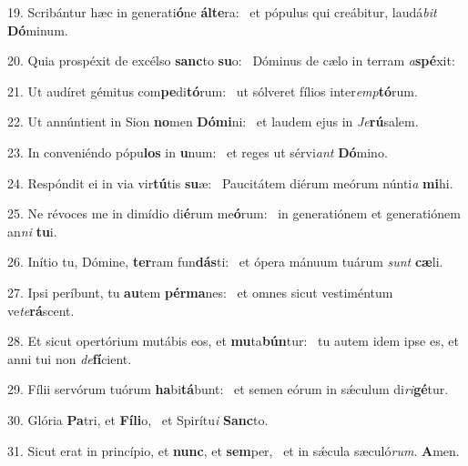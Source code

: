 19. Scribántur hæc in generati\textbf{ó}ne \textbf{ál}\textbf{te}ra: \ast\  et pópulus qui creábitur, laudá\textit{bit} \textbf{Dó}minum.\

20. Quia prospéxit de excélso \textbf{sanc}to \textbf{su}o: \ast\  Dóminus de cælo in terram \textit{a}\textbf{spé}xit:\

21. Ut audíret gémitus com\textbf{pe}di\textbf{tó}rum: \ast\  ut sólveret fílios inter\textit{emp}\textbf{tó}rum.\

22. Ut annúntient in Sion \textbf{no}men \textbf{Dó}\textbf{mi}ni: \ast\  et laudem ejus in \textit{Je}\textbf{rú}salem.\

23. In conveniéndo pópu\textbf{los} in \textbf{u}num: \ast\  et reges ut sérvi\textit{ant} \textbf{Dó}mino.\

24. Respóndit ei in via vir\textbf{tú}tis \textbf{su}æ: \ast\  Paucitátem diérum meórum núnti\textit{a} \textbf{mi}hi.\

25. Ne révoces me in dimídio di\textbf{é}rum me\textbf{ó}rum: \ast\  in generatiónem et generatiónem an\textit{ni} \textbf{tu}i.\

26. Inítio tu, Dómine, \textbf{ter}ram fun\textbf{dás}ti: \ast\  et ópera mánuum tuárum \textit{sunt} \textbf{cæ}li.\

27. Ipsi períbunt, tu \textbf{au}tem \textbf{pér}\textbf{ma}nes: \ast\  et omnes sicut vestiméntum ve\textit{te}\textbf{rá}scent.\

28. Et sicut opertórium mutábis eos, et \textbf{mu}ta\textbf{bún}tur: \ast\  tu autem idem ipse es, et anni tui non \textit{de}\textbf{fí}cient.\

29. Fílii servórum tuórum \textbf{ha}bi\textbf{tá}bunt: \ast\  et semen eórum in sǽculum di\textit{ri}\textbf{gé}tur.\

30. Glória \textbf{Pa}tri, et \textbf{Fí}\textbf{li}o, \ast\  et Spirítu\textit{i} \textbf{Sanc}to.\

31. Sicut erat in princípio, et \textbf{nunc}, et \textbf{sem}per, \ast\  et in sǽcula sæculó\textit{rum}. \textbf{A}men.\

